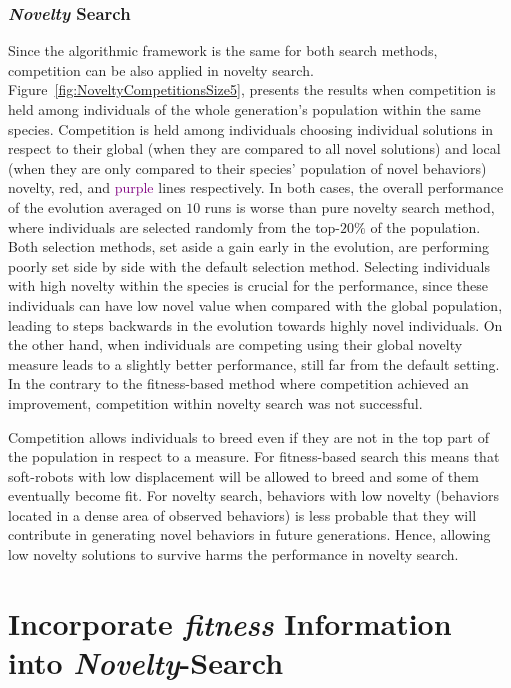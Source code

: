 \subsubsection*{\emph{Novelty} Search}

Since the algorithmic framework is the same for both search methods, competition can be also applied in novelty search. Figure~\ref{fig:NoveltyCompetitionsSize5}, presents the results when competition is held among individuals of the whole generation's population within the same species. Competition is held among individuals choosing individual solutions in respect to their global (when they are compared to all novel solutions) and local (when they are only compared to their species' population of novel behaviors) novelty, \textcolor{BrickRed}{red}, and \textcolor{Purple}{purple} lines respectively. In both cases, the overall performance of the evolution averaged on $10$ runs is worse than pure novelty search method, where individuals are selected randomly from the top-$20\%$ of the population. Both selection methods, set aside a gain early in the evolution, are performing poorly set side by side with the default selection method. Selecting individuals with high novelty within the species is crucial for the performance, since these individuals can have low novel value when compared with the global population, leading to steps backwards in the evolution towards highly novel individuals. On the other hand, when individuals are competing using their global novelty measure leads to a slightly better performance, still far from the default setting. In the contrary to the fitness-based method where competition achieved an improvement, competition within novelty search was not successful. 

Competition allows individuals to breed even if they are not in the top part of the population in respect to a measure. For fitness-based search this means that soft-robots with low displacement will be allowed to breed and some of them eventually become fit. For novelty search, behaviors with low novelty (behaviors located in a dense area of observed behaviors) is less probable that they will contribute in generating novel behaviors in future generations. Hence, allowing low novelty solutions to survive harms the performance in novelty search.


\section{Incorporate \emph{fitness} Information into \emph{Novelty}-Search}

